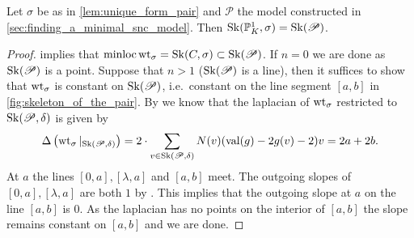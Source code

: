 \begin{proposition}\label{prop:model_P_is_KS}
	Let $\sigma$ be as in \cref{lem:unique_form_pair} and $\mathscr P$ the model constructed in \cref{sec:finding_a_minimal_snc_model}.
	Then $\operatorname{Sk}(\mathbb{P}^{1}_K, \sigma) = \operatorname{Sk}(\mathscr P)$. 
\end{proposition}
\begin{proof}
	 implies that $\operatorname{minloc} \operatorname{wt}_{\sigma} = \operatorname{Sk}(C, \sigma) \subset \operatorname{Sk}(\mathscr P) $. 
	If $n = 0$ we are done as $\operatorname{Sk}(\mathscr P) $ is a point. 
	Suppose that $n > 1$ ($\operatorname{Sk}(\mathscr P)$ is a line), then 
	it suffices to show that $\operatorname{wt}_\sigma$ is constant on $\operatorname{Sk}(\mathscr P)$, i.e.\ constant on the line segment $[a,b]$ in \cref{fig:skeleton_of_the_pair}. 
	By \cite[thm.\ 3.2.3.(3)]{bakerWeightFunctionsBerkovich2016} we know that the laplacian of $\operatorname{wt}_\sigma$ restricted to $\operatorname{Sk}(\mathscr P, \delta)$ is given by \[
		\Delta\left(\operatorname{wt}_\sigma|_{\operatorname{Sk}(\mathscr P, \delta)}\right) = 2\cdot \sum_{v \in \operatorname{Sk}(\mathscr P, \delta)} N(v)(\operatorname{val} (g) - 2g(v) - 2)v = 2a + 2b
	.\] 
	At $a$ the lines $[0, a],[\lambda, a]$ and  $[a, b]$ meet. 
	The outgoing slopes of  $[0, a], [\lambda, a]$ are both $1$ by \cite[3.2.3.(2)]{bakerWeightFunctionsBerkovich2016}. 
	This implies that the outgoing slope at $a$ on the line $[a, b]$ is $0$. 
	As the laplacian has no points on the interior of $[a, b]$ the slope remains constant on $[a, b]$ and we are done. 
\end{proof}



